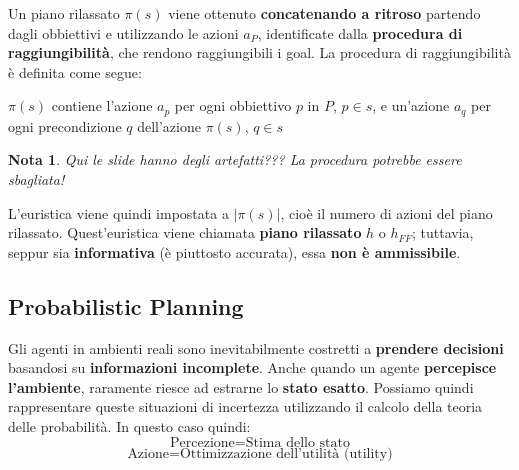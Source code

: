 \documentclass[12pt]{article}
\newtheorem{Nota}{Nota}[subsection]
\begin{document}
Un piano rilassato $\pi(s)$ viene ottenuto \textbf{concatenando a ritroso} partendo dagli obbiettivi e utilizzando le azioni $a_P$, identificate dalla \textbf{procedura di raggiungibilità}, che rendono raggiungibili i goal.
La procedura di raggiungibilità è definita come segue:
\begin{center}
    $\pi(s)$ contiene l'azione $a_p$ per ogni obbiettivo $p$ in $P$, $p \in s$, e un'azione $a_q$ per ogni precondizione $q$ dell'azione $\pi(s)$, $q \in s$
\end{center}
\begin{Nota}
    Qui le slide hanno degli artefatti??? La procedura potrebbe essere sbagliata!
\end{Nota}
L'euristica viene quindi impostata a $|\pi(s)|$, cioè il numero di azioni del piano rilassato.
Quest'euristica viene chiamata \textbf{piano rilassato} $h$ o $h_{FF}$; tuttavia, seppur sia \textbf{informativa} (è piuttosto accurata), essa \textbf{non è ammissibile}.
\subsection{Probabilistic Planning}
Gli agenti in ambienti reali sono inevitabilmente
costretti a \textbf{prendere decisioni} basandosi su \textbf{informazioni incomplete}.
Anche quando un agente \textbf{percepisce l'ambiente}, raramente riesce ad estrarne lo \textbf{stato esatto}.
Possiamo quindi rappresentare queste situazioni di incertezza utilizzando il calcolo della teoria delle probabilità.
In questo caso quindi:
$$\textrm{Percezione} = \textrm{Stima dello stato}$$
$$\textrm{Azione} = \textrm{Ottimizzazione dell'utilità (utility)}$$
\end{document}
